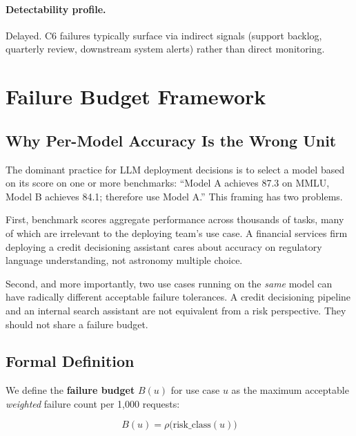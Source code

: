 \documentclass{article}
\begin{document}
\paragraph{Detectability profile.}
Delayed.  C6 failures typically surface via indirect signals (support backlog,
quarterly review, downstream system alerts) rather than direct monitoring.

\section{Failure Budget Framework}
\label{sec:budget}

\subsection{Why Per-Model Accuracy Is the Wrong Unit}

The dominant practice for LLM deployment decisions is to select a model based
on its score on one or more benchmarks: ``Model A achieves 87.3 on MMLU, Model B
achieves 84.1; therefore use Model A.''  This framing has two problems.

First, benchmark scores aggregate performance across thousands of tasks, many
of which are irrelevant to the deploying team's use case.  A financial services
firm deploying a credit decisioning assistant cares about accuracy on regulatory
language understanding, not astronomy multiple choice.

Second, and more importantly, two use cases running on the \emph{same} model
can have radically different acceptable failure tolerances.  A credit
decisioning pipeline and an internal search assistant are not equivalent from
a risk perspective.  They should not share a failure budget.

\subsection{Formal Definition}

We define the \textbf{failure budget} $B(u)$ for use case $u$ as the maximum
acceptable \emph{weighted} failure count per 1{,}000 requests:

\begin{equation}
  B(u) = \rho \bigl( \text{risk\_class}(u) \bigr)
  \label{eq:budget}
\end{equation}
\end{document}
